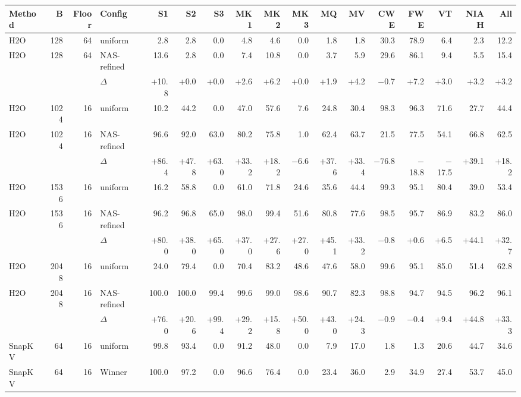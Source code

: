 \begin{table}[t]
  \centering
  \scriptsize
  \setlength{\tabcolsep}{2.5pt}
  \begin{tabular}{@{}l r r l r r r r r r r r r r r r r @{}}
    \toprule
    Method & B & Floor & Config & S1 & S2 & S3 & MK1 & MK2 & MK3 & MQ & MV & CWE & FWE & VT & NIAH & All \\
    \midrule
    H2O & 128 & 64 & uniform & 2.8 & 2.8 & 0.0 & 4.8 & 4.6 & 0.0 & 1.8 & 1.8 & 30.3 & 78.9 & 6.4 & 2.3 & 12.2 \\
    H2O & 128 & 64 & NAS-refined & 13.6 & 2.8 & 0.0 & 7.4 & 10.8 & 0.0 & 3.7 & 5.9 & 29.6 & 86.1 & 9.4 & 5.5 & 15.4 \\
     &  &  & $\Delta$ & +10.8 & +0.0 & +0.0 & +2.6 & +6.2 & +0.0 & +1.9 & +4.2 & $-$0.7 & +7.2 & +3.0 & +3.2 & +3.2 \\
    \midrule
    H2O & 1024 & 16 & uniform & 10.2 & 44.2 & 0.0 & 47.0 & 57.6 & 7.6 & 24.8 & 30.4 & 98.3 & 96.3 & 71.6 & 27.7 & 44.4 \\
    H2O & 1024 & 16 & NAS-refined & 96.6 & 92.0 & 63.0 & 80.2 & 75.8 & 1.0 & 62.4 & 63.7 & 21.5 & 77.5 & 54.1 & 66.8 & 62.5 \\
     &  &  & $\Delta$ & +86.4 & +47.8 & +63.0 & +33.2 & +18.2 & $-$6.6 & +37.6 & +33.4 & $-$76.8 & $-$18.8 & $-$17.5 & +39.1 & +18.2 \\
    \midrule
    H2O & 1536 & 16 & uniform & 16.2 & 58.8 & 0.0 & 61.0 & 71.8 & 24.6 & 35.6 & 44.4 & 99.3 & 95.1 & 80.4 & 39.0 & 53.4 \\
    H2O & 1536 & 16 & NAS-refined & 96.2 & 96.8 & 65.0 & 98.0 & 99.4 & 51.6 & 80.8 & 77.6 & 98.5 & 95.7 & 86.9 & 83.2 & 86.0 \\
     &  &  & $\Delta$ & +80.0 & +38.0 & +65.0 & +37.0 & +27.6 & +27.0 & +45.1 & +33.2 & $-$0.8 & +0.6 & +6.5 & +44.1 & +32.7 \\
    \midrule
    H2O & 2048 & 16 & uniform & 24.0 & 79.4 & 0.0 & 70.4 & 83.2 & 48.6 & 47.6 & 58.0 & 99.6 & 95.1 & 85.0 & 51.4 & 62.8 \\
    H2O & 2048 & 16 & NAS-refined & 100.0 & 100.0 & 99.4 & 99.6 & 99.0 & 98.6 & 90.7 & 82.3 & 98.8 & 94.7 & 94.5 & 96.2 & 96.1 \\
     &  &  & $\Delta$ & +76.0 & +20.6 & +99.4 & +29.2 & +15.8 & +50.0 & +43.0 & +24.3 & $-$0.9 & $-$0.4 & +9.4 & +44.8 & +33.3 \\
    \midrule
    SnapKV & 64 & 16 & uniform & 99.8 & 93.4 & 0.0 & 91.2 & 48.0 & 0.0 & 7.9 & 17.0 & 1.8 & 1.3 & 20.6 & 44.7 & 34.6 \\
    SnapKV & 64 & 16 & Winner & 100.0 & 97.2 & 0.0 & 96.6 & 76.4 & 0.0 & 23.4 & 36.0 & 2.9 & 34.9 & 27.4 & 53.7 & 45.0 \\

\end{tabular}
\end{table}
